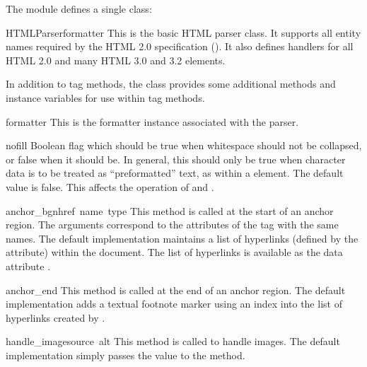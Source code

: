 The module defines a single class:

\begin{funcdesc}{HTMLParser}{formatter}
This is the basic HTML parser class.  It supports all entity names
required by the HTML 2.0 specification ().  It also defines
handlers for all HTML 2.0 and many HTML 3.0 and 3.2 elements.
\end{funcdesc}

In addition to tag methods, the  class provides some
additional methods and instance variables for use within tag methods.

\renewcommand{\indexsubitem}{(HTMLParser attribute)}

\begin{datadesc}{formatter}
This is the formatter instance associated with the parser.
\end{datadesc}

\begin{datadesc}{nofill}
Boolean flag which should be true when whitespace should not be
collapsed, or false when it should be.  In general, this should only
be true when character data is to be treated as ``preformatted'' text,
as within a  element.  The default value is false.  This
affects the operation of  and .
\end{datadesc}

\renewcommand{\indexsubitem}{(HTMLParser method)}

\begin{funcdesc}{anchor_bgn}{href\, name\, type}
This method is called at the start of an anchor region.  The arguments
correspond to the attributes of the  tag with the same
names.  The default implementation maintains a list of hyperlinks
(defined by the  attribute) within the document.  The list
of hyperlinks is available as the data attribute .
\end{funcdesc}

\begin{funcdesc}{anchor_end}{}
This method is called at the end of an anchor region.  The default
implementation adds a textual footnote marker using an index into the
list of hyperlinks created by .
\end{funcdesc}

\begin{funcdesc}{handle_image}{source\, alt}
This method is called to handle images.  The default implementation
simply passes the  value to the 
method.
\end{funcdesc}

